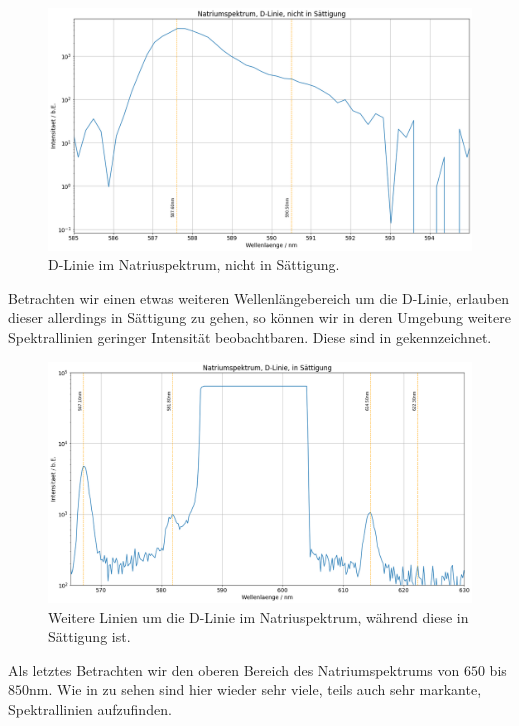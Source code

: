 \begin{figure}[H]
  \centering
  \includegraphics[width=.9\textwidth]{files/plots/na_spek_dlinie_nichtsaett.png}
  \caption{D-Linie im Natriuspektrum, nicht in Sättigung.}
  \label{fig:na_spek_dlinie_nichtsaett}
\end{figure}

Betrachten wir einen etwas weiteren Wellenlängebereich um die D-Linie, erlauben dieser allerdings in Sättigung zu gehen, so können wir in deren Umgebung weitere Spektrallinien geringer Intensität beobachtbaren. Diese sind in  gekennzeichnet.

\begin{figure}[H]
  \centering
  \includegraphics[width=.9\textwidth]{files/plots/na_spek_dlinie_saett.png}
  \caption{Weitere Linien um die D-Linie im Natriuspektrum, während diese in Sättigung ist.}
  \label{fig:na_spek_dlinie_saett}
\end{figure}

Als letztes Betrachten wir den oberen Bereich des Natriumspektrums von $650$ bis $850\si{\nano\meter}$. Wie in  zu sehen sind hier wieder sehr viele, teils auch sehr markante, Spektrallinien aufzufinden. 


